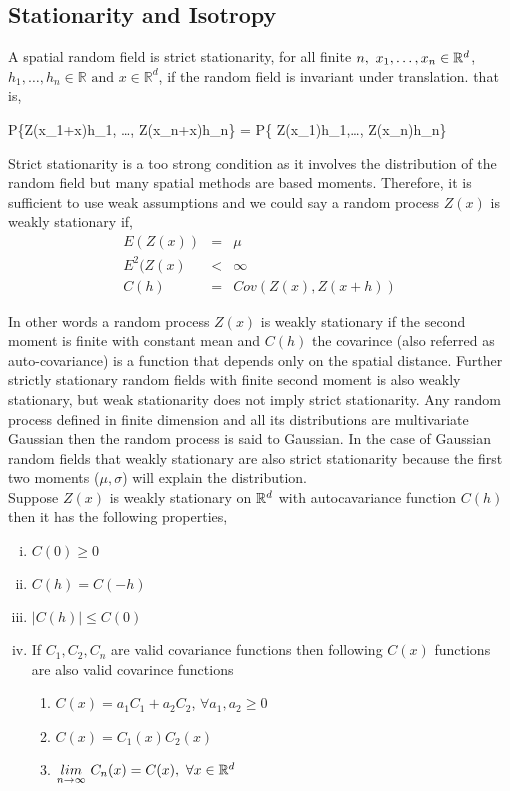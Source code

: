 \subsection{Stationarity and Isotropy}

A spatial random field is strict stationarity, for all finite $n,\ x_1,\ldots, x_n \in \mathbb{R}^d$, $h_1, \ldots, h_n\in\mathbb{R} \mbox{ and } x\in \mathbb{R}^d$, if the random field is invariant under translation. that is,

\beq
P\{Z(x_1+x)\le h_1, \ldots, Z(x_n+x)\le h_n\} = P\{ Z(x_1)\le h_1,\ldots, Z(x_n)\le h_n\}
\eeq

Strict stationarity is a too strong condition as it involves the distribution of the random field but many spatial methods are based moments. Therefore, it is sufficient to use weak assumptions and we could say a random process $Z(x)$ is weakly stationary if, 
\begin{eqnarray}
	E(Z(x))   & = & \mu \nonumber \\ 
	E^2(Z(x)  & < & \infty \nonumber \\  
	C(h)      & = & Cov(Z(x),Z(x+h))
\end{eqnarray}

In other words a random process $Z(x)$ is weakly stationary if the second moment is finite with constant mean and $C(h)$ the covarince (also referred as auto-covariance) is a function that depends only on the spatial distance. Further strictly stationary random fields with finite second moment is also weakly stationary, but weak stationarity does not imply strict stationarity. Any random process defined in finite dimension and all its distributions are multivariate Gaussian then the random process is said to Gaussian. In the case of Gaussian random fields that weakly stationary are also strict stationarity because the first two moments ($\mu, \sigma$) will explain the distribution. \\

Suppose $Z(x)$ is weakly stationary on $\mathbb{R}^d$ with autocavariance function $C(h)$ then it has the following properties,

\begin{enumerate}[(i)]
	\item $C(0) \ge 0$
	\item $C(h) = C(-h)$
	\item $|C(h)| \le  C(0)$
	\item If $C_1, C_2, C_n$ are valid covariance functions then following $C(x)$ functions are also valid covarince functions
	      
	      \begin{enumerate}
	      	\item $C(x) = a_1C_1+a_2C_2$, $\forall a_1,a_2\ge 0$
	      	\item $C(x) = C_1(x)C_2(x)$
	      	\item $\underset{n\to\infty} {lim}\ C_n(x)=C(x),\ \forall x\in \R^d$ 
	      \end{enumerate}
	      
\end{enumerate}

